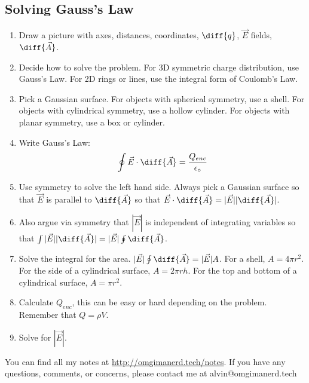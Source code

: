 \documentclass{math}
\begin{document}
\subsection*{Solving Gauss's Law}
\begin{enumerate}
  \item Draw a picture with axes, distances, coordinates, \( \diff{q} \),
  \( \vec{E} \) fields, \( \diff{\vec{A}} \).
  \item Decide how to solve the problem. For 3D symmetric charge distribution,
  use Gauss's Law. For 2D rings or lines, use the integral form of Coulomb's
  Law.
  \item Pick a Gaussian surface. For objects with spherical symmetry, use a
  shell. For objects with cylindrical symmetry, use a hollow cylinder. For
  objects with planar symmetry, use a box or cylinder.
  \item Write Gauss's Law:
  \[ \oint\vec{E}\cdot\diff{\vec{A}} = \frac{Q_{enc}}{\epsilon_{\circ}} \]
  \item Use symmetry to solve the left hand side. Always pick a Gaussian surface
  so that \( \vec{E} \) is parallel to \( \diff{\vec{A}} \) so that
  \( \vec{E}\cdot\diff{\vec{A}} = |\vec{E}||\diff{\vec{A}}| \).
  \item Also argue via symmetry that \( |\vec{E}| \) is independent of
  integrating variables so that \( \int|\vec{E}||\diff{\vec{A}}| =
  |\vec{E}|\oint\diff{\vec{A}} \).
  \item Solve the integral for the area. \( |\vec{E}|\oint\diff{\vec{A}} =
  |\vec{E}|A \). For a shell, \( A = 4\pi r^2 \). For the side of a cylindrical
  surface, \( A = 2\pi rh \). For the top and bottom of a cylindrical surface,
  \( A = \pi r^2 \).
  \item Calculate \( Q_{enc} \), this can be easy or hard depending on the
  problem. Remember that \( Q = \rho V \).
  \item Solve for \( |\vec{E}| \).
\end{enumerate}

\begin{center}
  You can find all my notes at \url{http://omgimanerd.tech/notes}. If you have
  any questions, comments, or concerns, please contact me at
  alvin@omgimanerd.tech
\end{center}
\end{document}
